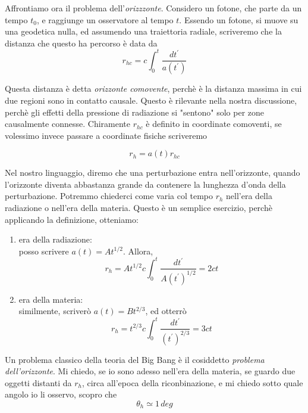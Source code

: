 \documentclass{report}
\begin{document}
Affrontiamo ora il problema dell'\emph{orizzzonte}. Considero un fotone, che parte da un tempo $t_0$, e raggiunge un osservatore al tempo $t$. Essendo un fotone, si muove su una geodetica nulla, ed assumendo una traiettoria radiale, scriveremo che la distanza che questo ha percorso è data da 
\begin{equation}
    r_{hc} = c\int_0^t \frac{dt^{'}}{a(t^{'})} 
\end{equation}

Questa distanza è detta \emph{orizzonte comovente}, perchè è la distanza massima in cui due regioni sono in contatto causale. Questo è rilevante nella nostra discussione, perchè gli effetti della pressione di radiazione si "sentono" solo per zone causalmente connesse. Chiramente $r_{hc}$ è definito in coordinate comoventi, se volessimo invece passare a coordinate fisiche scriveremo

\begin{equation}
    r_h = a(t)r_{hc}
\end{equation}

Nel nostro linguaggio, diremo che una perturbazione entra nell'orizzonte, quando l'orizzonte diventa abbastanza grande da contenere la lunghezza d'onda della perturbazione. Potremmo chiederci come varia col tempo $r_h$ nell'era della radiazione o nell'era della materia. Questo è un semplice esercizio, perchè applicando la definizione, otteniamo: 
\begin{enumerate}
    \item era della radiazione: \\
    posso scrivere $a(t) = At^{1/2}$. Allora, 
    \begin{equation}
        r_h = At^{1/2}c\int_0^t\frac{dt^{'}}{A(t^{'})^{1/2}} = 2ct
    \end{equation}
    \item era della materia: \\
    similmente, scriverò $a(t) = Bt^{2/3}$, ed otterrò
    \begin{equation}
        r_h = t^{2/3}c\int_0^t\frac{dt^{'}}{(t^{'})^{2/3}} = 3ct
    \end{equation}
    \end{enumerate}

Un problema classico della teoria del Big Bang è il cosiddetto \emph{problema dell'orizzonte}. Mi chiedo, se io sono adesso nell'era della materia, se guardo due oggetti distanti da $r_h$, circa all'epoca della riconbinazione, e mi chiedo sotto quale angolo io li osservo, scopro che 
\begin{equation}
    \theta_h \simeq 1 \, deg
\end{equation}
\end{document}
